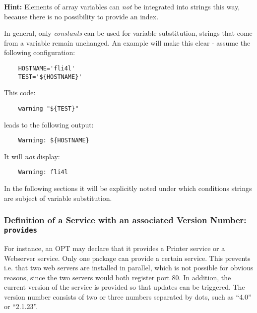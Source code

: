    \textbf{Hint:} Elements of array variables can \emph{not} be integrated into
    strings this way, because there is no possibility to provide an index.

    In general, only \emph{constants} can be used for variable substitution,
    strings that come from a variable remain unchanged. An example will make
    this clear - assume the following configuration:

\begin{example}
\begin{verbatim}
    HOSTNAME='fli4l'
    TEST='${HOSTNAME}'
\end{verbatim}
\end{example}

    This code:

\begin{example}
\begin{verbatim}
    warning "${TEST}"
\end{verbatim}
\end{example}

    leads to the following output:

\begin{example}
\begin{verbatim}
    Warning: ${HOSTNAME}
\end{verbatim}
\end{example}

    It will \emph{not} display:

\begin{example}
\begin{verbatim}
    Warning: fli4l
\end{verbatim}
\end{example}

    In the following sections it will be explicitly noted under which conditions
    strings are subject of variable substitution.

\subsubsection{Definition of a Service with an associated
    Version Number: \texttt{provides}}

    For instance, an OPT may declare that it provides a Printer service or a
    Webserver service. Only one package can provide a certain service.
    This prevents i.e. that two web servers are installed in parallel, which
    is not possible for obvious reasons, since the two servers would both
    register port 80. In addition, the current version of the service is
    provided so that updates can be triggered. The version number consists
    of two or three numbers separated by dots, such as ``4.0'' or ``2.1.23''.

